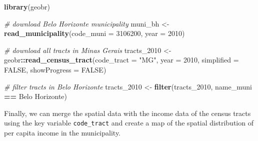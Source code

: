 \documentclass[
]{article}
\newenvironment{Shaded}{\begin{snugshade}}{\end{snugshade}}
\newcommand{\AttributeTok}[1]{\textcolor[rgb]{0.13,0.29,0.53}{#1}}
\newcommand{\CommentTok}[1]{\textcolor[rgb]{0.56,0.35,0.01}{\textit{#1}}}
\newcommand{\ConstantTok}[1]{\textcolor[rgb]{0.56,0.35,0.01}{#1}}
\newcommand{\DecValTok}[1]{\textcolor[rgb]{0.00,0.00,0.81}{#1}}
\newcommand{\FunctionTok}[1]{\textcolor[rgb]{0.13,0.29,0.53}{\textbf{#1}}}
\newcommand{\NormalTok}[1]{#1}
\newcommand{\OtherTok}[1]{\textcolor[rgb]{0.56,0.35,0.01}{#1}}
\newcommand{\SpecialCharTok}[1]{\textcolor[rgb]{0.81,0.36,0.00}{\textbf{#1}}}
\newcommand{\StringTok}[1]{\textcolor[rgb]{0.31,0.60,0.02}{#1}}
\begin{document}
\begin{Shaded}
\begin{Highlighting}[]
\FunctionTok{library}\NormalTok{(geobr)}

\CommentTok{\# download Belo Horizonte municipality}
\NormalTok{muni\_bh }\OtherTok{\textless{}{-}} \FunctionTok{read\_municipality}\NormalTok{(}\AttributeTok{code\_muni =} \DecValTok{3106200}\NormalTok{,}
                             \AttributeTok{year =} \DecValTok{2010}\NormalTok{)}

\CommentTok{\# download all tracts in Minas Gerais}
\NormalTok{tracts\_2010 }\OtherTok{\textless{}{-}}\NormalTok{ geobr}\SpecialCharTok{::}\FunctionTok{read\_census\_tract}\NormalTok{(}\AttributeTok{code\_tract =} \StringTok{"MG"}\NormalTok{,}
                                        \AttributeTok{year =} \DecValTok{2010}\NormalTok{,}
                                        \AttributeTok{simplified =} \ConstantTok{FALSE}\NormalTok{,}
                                        \AttributeTok{showProgress =} \ConstantTok{FALSE}\NormalTok{)}

\CommentTok{\# filter tracts in Belo Horizonte}
\NormalTok{tracts\_2010 }\OtherTok{\textless{}{-}} \FunctionTok{filter}\NormalTok{(tracts\_2010, name\_muni }\SpecialCharTok{==} \StringTok{\textquotesingle{}Belo Horizonte\textquotesingle{}}\NormalTok{)}
\end{Highlighting}
\end{Shaded}

Finally, we can merge the spatial data with the income data of the
census tracts using the key variable \texttt{code\_tract} and create a
map of the spatial distribution of per capita income in the
municipality.
\end{document}
